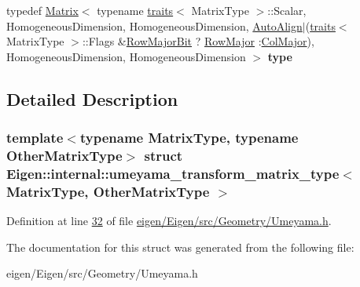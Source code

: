 \begin{DoxyCompactItemize}
\item 
\mbox{\label{struct_eigen_1_1internal_1_1umeyama__transform__matrix__type_ac9515b0834bee3cf4a9ce0ed3adc9b2c}} 
typedef \hyperlink{group___core___module_class_eigen_1_1_matrix}{Matrix}$<$ typename \hyperlink{struct_eigen_1_1internal_1_1traits}{traits}$<$ Matrix\+Type $>$\+::Scalar, Homogeneous\+Dimension, Homogeneous\+Dimension, \hyperlink{group__enums_ggaacded1a18ae58b0f554751f6cdf9eb13a28d63c0dd8560827162decfd898804f4}{Auto\+Align}$\vert$(\hyperlink{struct_eigen_1_1internal_1_1traits}{traits}$<$ Matrix\+Type $>$\+::Flags \&\hyperlink{group__flags_gae4f56c2a60bbe4bd2e44c5b19cbe8762}{Row\+Major\+Bit} ? \hyperlink{group__enums_ggaacded1a18ae58b0f554751f6cdf9eb13acfcde9cd8677c5f7caf6bd603666aae3}{Row\+Major} \+:\hyperlink{group__enums_ggaacded1a18ae58b0f554751f6cdf9eb13a0cbd4bdd0abcfc0224c5fcb5e4f6669a}{Col\+Major}), Homogeneous\+Dimension, Homogeneous\+Dimension $>$ {\bfseries type}
\end{DoxyCompactItemize}


\subsection{Detailed Description}
\subsubsection*{template$<$typename Matrix\+Type, typename Other\+Matrix\+Type$>$\newline
struct Eigen\+::internal\+::umeyama\+\_\+transform\+\_\+matrix\+\_\+type$<$ Matrix\+Type, Other\+Matrix\+Type $>$}



Definition at line \hyperlink{eigen_2_eigen_2src_2_geometry_2_umeyama_8h_source_l00032}{32} of file \hyperlink{eigen_2_eigen_2src_2_geometry_2_umeyama_8h_source}{eigen/\+Eigen/src/\+Geometry/\+Umeyama.\+h}.



The documentation for this struct was generated from the following file\+:\begin{DoxyCompactItemize}
\item 
eigen/\+Eigen/src/\+Geometry/\+Umeyama.\+h\end{DoxyCompactItemize}
